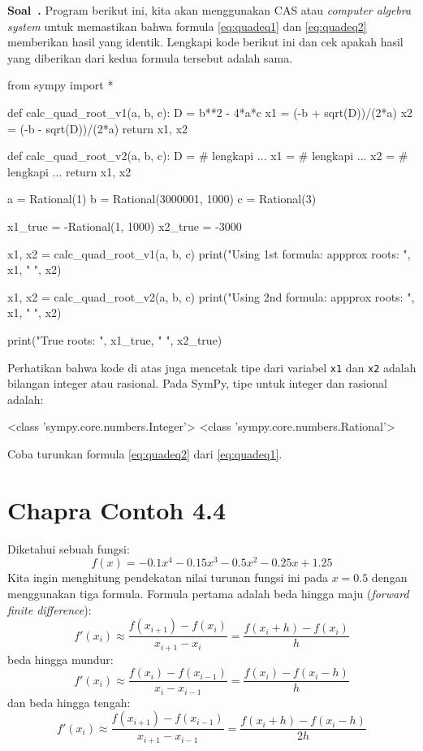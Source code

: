 \documentclass[a4paper,11pt,bahasa]{article} %
\newcommand{\txtinline}[1]{\texttt{#1}}
\newcounter{soal}%
\newenvironment{soal}[1][]{\refstepcounter{soal}\par\medskip
   \noindent \textbf{Soal~\thesoal. #1} \sffamily}{\medskip}
\begin{document}
\begin{soal}
Program berikut ini, kita akan menggunakan CAS atau \textit{computer algebra system}
untuk memastikan bahwa formula \eqref{eq:quadeq1} dan \eqref{eq:quadeq2} memberikan
hasil yang identik. Lengkapi kode berikut ini dan cek apakah hasil yang diberikan
dari kedua formula tersebut adalah sama.
\begin{pythoncode}
from sympy import *

def calc_quad_root_v1(a, b, c):
  D = b**2 - 4*a*c
  x1 = (-b + sqrt(D))/(2*a)
  x2 = (-b - sqrt(D))/(2*a)
  return x1, x2
  
def calc_quad_root_v2(a, b, c):
  D = # lengkapi ...
  x1 = # lengkapi ...
  x2 = # lengkapi ... 
  return x1, x2
  
a = Rational(1)
b = Rational(3000001, 1000)
c = Rational(3)
  
x1_true = -Rational(1, 1000)
x2_true = -3000
  
x1, x2 = calc_quad_root_v1(a, b, c)
print("Using 1st formula: appprox roots: ", x1, " ", x2)

x1, x2 = calc_quad_root_v2(a, b, c)
print("Using 2nd formula: appprox roots: ", x1, " ", x2)

print("True roots: ", x1_true, " ", x2_true)
\end{pythoncode}
Perhatikan bahwa kode di atas juga mencetak tipe dari variabel \txtinline{x1} dan
\txtinline{x2} adalah bilangan integer atau rasional.
Pada SymPy, tipe untuk integer dan rasional adalah:
\begin{textcode}
<class 'sympy.core.numbers.Integer'> <class 'sympy.core.numbers.Rational'>
\end{textcode}
Coba turunkan formula \eqref{eq:quadeq2} dari \eqref{eq:quadeq1}.
\end{soal}


\section{Chapra Contoh 4.4}
Diketahui sebuah fungsi:
\begin{equation}
f(x) = -0.1x^4 - 0.15x^3 - 0.5x^2 - 0.25x + 1.25
\end{equation}
Kita ingin menghitung pendekatan nilai turunan fungsi ini pada $x=0.5$ dengan menggunakan tiga formula.
Formula pertama adalah beda hingga maju (\textit{forward finite difference}):
\begin{equation}
f'(x_{i}) \approx \frac{f(x_{i+1}) - f(x_{i})}{x_{i+1} - x_{i}} =
\frac{f(x_{i}+h) - f(x_{i})}{h}
\end{equation}
beda hingga mundur:
\begin{equation}
f'(x_{i}) \approx \frac{f(x_{i}) - f(x_{i-1})}{x_{i} - x_{i-1}} =
\frac{f(x_{i}) - f(x_{i}-h)}{h}
\end{equation}
dan beda hingga tengah:
\begin{equation}
f'(x_{i}) \approx \frac{f(x_{i+1}) - f(x_{i-1})}{x_{i+1} - x_{i-1}} =
\frac{f(x_{i}+h) - f(x_{i}-h)}{2h}
\end{equation}
\end{document}
